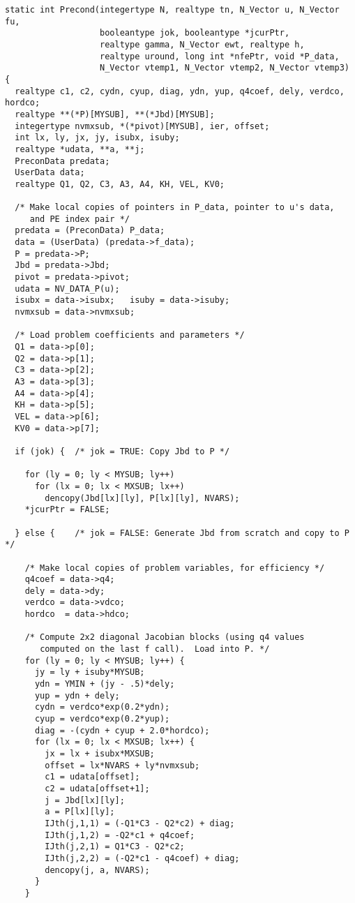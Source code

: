 \begin{verbatim}
static int Precond(integertype N, realtype tn, N_Vector u, N_Vector fu, 
                   booleantype jok, booleantype *jcurPtr, 
                   realtype gamma, N_Vector ewt, realtype h,
                   realtype uround, long int *nfePtr, void *P_data,
                   N_Vector vtemp1, N_Vector vtemp2, N_Vector vtemp3)
{
  realtype c1, c2, cydn, cyup, diag, ydn, yup, q4coef, dely, verdco, hordco;
  realtype **(*P)[MYSUB], **(*Jbd)[MYSUB];
  integertype nvmxsub, *(*pivot)[MYSUB], ier, offset;
  int lx, ly, jx, jy, isubx, isuby;
  realtype *udata, **a, **j;
  PreconData predata;
  UserData data;
  realtype Q1, Q2, C3, A3, A4, KH, VEL, KV0;

  /* Make local copies of pointers in P_data, pointer to u's data,
     and PE index pair */
  predata = (PreconData) P_data;
  data = (UserData) (predata->f_data);
  P = predata->P;
  Jbd = predata->Jbd;
  pivot = predata->pivot;
  udata = NV_DATA_P(u);
  isubx = data->isubx;   isuby = data->isuby;
  nvmxsub = data->nvmxsub;

  /* Load problem coefficients and parameters */
  Q1 = data->p[0];
  Q2 = data->p[1];
  C3 = data->p[2];
  A3 = data->p[3];
  A4 = data->p[4];
  KH = data->p[5];
  VEL = data->p[6];
  KV0 = data->p[7];

  if (jok) {  /* jok = TRUE: Copy Jbd to P */

    for (ly = 0; ly < MYSUB; ly++)
      for (lx = 0; lx < MXSUB; lx++)
        dencopy(Jbd[lx][ly], P[lx][ly], NVARS);
    *jcurPtr = FALSE;

  } else {    /* jok = FALSE: Generate Jbd from scratch and copy to P */

    /* Make local copies of problem variables, for efficiency */
    q4coef = data->q4;
    dely = data->dy;
    verdco = data->vdco;
    hordco  = data->hdco;
    
    /* Compute 2x2 diagonal Jacobian blocks (using q4 values 
       computed on the last f call).  Load into P. */
    for (ly = 0; ly < MYSUB; ly++) {
      jy = ly + isuby*MYSUB;
      ydn = YMIN + (jy - .5)*dely;
      yup = ydn + dely;
      cydn = verdco*exp(0.2*ydn);
      cyup = verdco*exp(0.2*yup);
      diag = -(cydn + cyup + 2.0*hordco);
      for (lx = 0; lx < MXSUB; lx++) {
        jx = lx + isubx*MXSUB;
        offset = lx*NVARS + ly*nvmxsub;
        c1 = udata[offset];
        c2 = udata[offset+1];
        j = Jbd[lx][ly];
        a = P[lx][ly];
        IJth(j,1,1) = (-Q1*C3 - Q2*c2) + diag;
        IJth(j,1,2) = -Q2*c1 + q4coef;
        IJth(j,2,1) = Q1*C3 - Q2*c2;
        IJth(j,2,2) = (-Q2*c1 - q4coef) + diag;
        dencopy(j, a, NVARS);
      }
    }
    

\end{verbatim}
